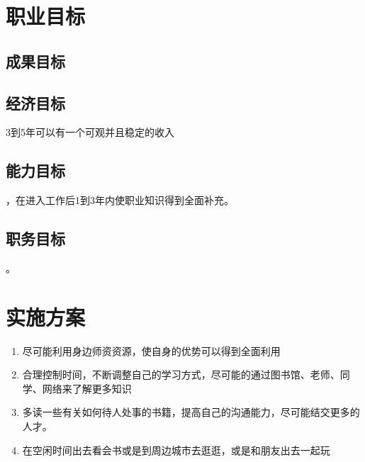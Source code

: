 \documentclass{article}
\begin{document}
\section{职业目标}

\subsection{成果目标}
\begin{enumerate}[(1)]
\end{enumerate}
\par
\subsection{经济目标}
\begin{enumerate}[(1)]
3到5年可以有一个可观并且稳定的收入
\end{enumerate}
\par
\subsection{能力目标}
\begin{enumerate}[(1)]
，在进入工作后1到3年内使职业知识得到全面补充。
\end{enumerate}
\par
\subsection{职务目标}
\begin{enumerate}[(1)]
。
\end{enumerate}
\par

\section{实施方案}
\begin{enumerate}[1]
	\item 尽可能利用身边师资资源，使自身的优势可以得到全面利用
	\item 合理控制时间，不断调整自己的学习方式，尽可能的通过图书馆、老师、同学、网络来了解更多知识
	\item 多读一些有关如何待人处事的书籍，提高自己的沟通能力，尽可能结交更多的人才。
	\item 在空闲时间出去看会书或是到周边城市去逛逛，或是和朋友出去一起玩
\end{enumerate}
\par 
\end{document}
